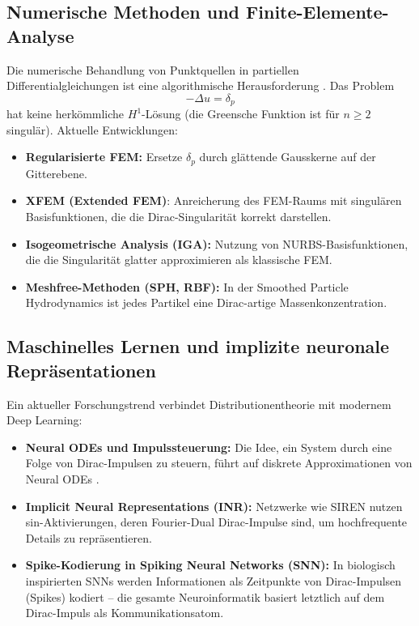 ﻿\documentclass[a4paper,12pt]{article}
\theoremstyle{definition}
\begin{document}
\subsection{Numerische Methoden und Finite-Elemente-Analyse}

Die numerische Behandlung von Punktquellen in partiellen Differentialgleichungen ist
eine algorithmische Herausforderung \cite{brenner2008mathematical}. Das Problem
\[
-\Delta u = \delta_{p}
\]
hat keine herk\"ommliche $H^1$-L\"osung (die Greensche Funktion ist f\"ur $n \geq 2$
singul\"ar). Aktuelle Entwicklungen:
\begin{itemize}
    \item \textbf{Regularisierte FEM:} Ersetze $\delta_p$ durch gl\"attende Gausskerne
          auf der Gitterebene.
    \item \textbf{XFEM (Extended FEM)}: Anreicherung des FEM-Raums mit singul\"aren
          Basisfunktionen, die die Dirac-Singularit\"at korrekt darstellen.
    \item \textbf{Isogeometrische Analysis (IGA):} Nutzung von NURBS-Basisfunktionen,
          die die Singularit\"at glatter approximieren als klassische FEM.
    \item \textbf{Meshfree-Methoden (SPH, RBF):} In der Smoothed Particle Hydrodynamics
          ist jedes Partikel eine Dirac-artige Massenkonzentration.
\end{itemize}

\subsection{Maschinelles Lernen und implizite neuronale Repr\"asentationen}

Ein aktueller Forschungstrend verbindet Distributionentheorie mit modernem Deep Learning:
\begin{itemize}
    \item \textbf{Neural ODEs und Impulssteuerung:} Die Idee, ein System durch eine
          Folge von Dirac-Impulsen zu steuern, f\"uhrt auf diskrete Approximationen von
          Neural ODEs \cite{chen2018neuralode}.
    \item \textbf{Implicit Neural Representations (INR):} Netzwerke wie SIREN
          \cite{sitzmann2020implicit} nutzen sin-Aktivierungen, deren Fourier-Dual
          Dirac-Impulse sind, um hochfrequente Details zu repr\"asentieren.
    \item \textbf{Spike-Kodierung in Spiking Neural Networks (SNN):} In biologisch
          inspirierten SNNs werden Informationen als Zeitpunkte von Dirac-Impulsen
          (Spikes) kodiert -- die gesamte Neuroinformatik basiert letztlich auf dem
          Dirac-Impuls als Kommunikationsatom.
\end{itemize}
\end{document}
